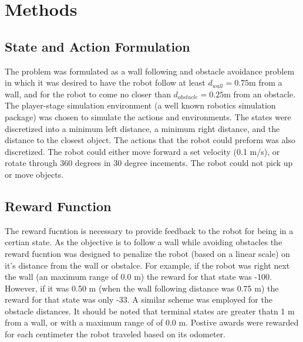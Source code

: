 \documentclass[conference]{IEEEtran}
\begin{document}
\section{Methods}
\subsection{State and Action Formulation}
The problem was formulated as a wall following and obstacle avoidance problem in which it was desired to have the robot follow at least $d_{wall} = 0.75 \text{m}$ from a wall, and for the robot to come no closer than $d_{obstacle} = 0.25 \text{m}$ from an obstacle.
The player-stage simulation environment\cite{gerkey_player_2012} (a well known robotics simulation package) was chosen to simulate the actions and environments.  The states were discretized into a minimum left distance, a minimum right distance, and the distance to the closest object.
The actions that the robot could preform was also discretized.  
The robot could either move forward a set velocity (0.1 m/s), or rotate through 360 degrees in 30 degree incements.
The robot could not pick up or move objects.
\subsection{Reward Function}
The reward fucntion is necessary to provide feedback to the robot for being in a certian state.
As the objective is to follow a wall while avoiding obstacles the reward fucntion was designed to penalize the robot (based on a linear scale) on it's distance from the wall or obstalce.   
For example, if the robot was right next the wall (an maximum range of 0.0 m) the reward for that state was -100.  
However, if it was 0.50 m (when the wall following distance was 0.75 m) the reward for that state was only -33.
A similar scheme was employed for the obstacle distances.
It should be noted that terminal states are greater thatn 1 m from a wall, or with a maximum range of of 0.0 m.
Postive awards were rewarded for each centimeter the robot traveled based on its odometer.
\end{document}
